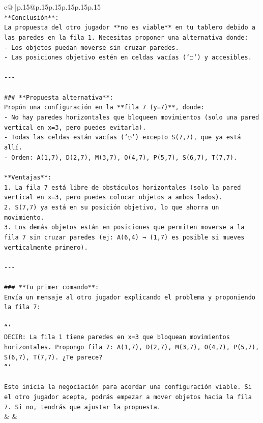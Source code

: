 \documentclass{article}
\begin{document}
{\begin{supertabular}{c@{$\;$}|p{.15\linewidth}@{}p{.15\linewidth}p{.15\linewidth}p{.15\linewidth}p{.15\linewidth}p{.15\linewidth}}
{{{\\ 
\texttt{**Conclusión**:} \\
\texttt{La propuesta del otro jugador **no es viable** en tu tablero debido a las paredes en la fila 1. Necesitas proponer una alternativa donde:} \\
\texttt{{-} Los objetos puedan moverse sin cruzar paredes.} \\
\texttt{{-} Las posiciones objetivo estén en celdas vacías (`◌`) y accesibles.} \\
\\ 
\texttt{{-}{-}{-}} \\
\\ 
\texttt{\#\#\# **Propuesta alternativa**:} \\
\texttt{Propón una configuración en la **fila 7 (y=7)**, donde:} \\
\texttt{{-} No hay paredes horizontales que bloqueen movimientos (solo una pared vertical en x=3, pero puedes evitarla).} \\
\texttt{{-} Todas las celdas están vacías (`◌`) excepto S(7,7), que ya está allí.} \\
\texttt{{-} Orden: A(1,7), D(2,7), M(3,7), O(4,7), P(5,7), S(6,7), T(7,7).} \\
\\ 
\texttt{**Ventajas**:} \\
\texttt{1. La fila 7 está libre de obstáculos horizontales (solo la pared vertical en x=3, pero puedes colocar objetos a ambos lados).} \\
\texttt{2. S(7,7) ya está en su posición objetivo, lo que ahorra un movimiento.} \\
\texttt{3. Los demás objetos están en posiciones que permiten moverse a la fila 7 sin cruzar paredes (ej: A(6,4) → (1,7) es posible si mueves verticalmente primero).} \\
\\ 
\texttt{{-}{-}{-}} \\
\\ 
\texttt{\#\#\# **Tu primer comando**:} \\
\texttt{Envía un mensaje al otro jugador explicando el problema y proponiendo la fila 7:} \\
\\ 
\texttt{```} \\
\texttt{DECIR: La fila 1 tiene paredes en x=3 que bloquean movimientos horizontales. Propongo fila 7: A(1,7), D(2,7), M(3,7), O(4,7), P(5,7), S(6,7), T(7,7). ¿Te parece?} \\
\texttt{```} \\
\\ 
\texttt{Esto inicia la negociación para acordar una configuración viable. Si el otro jugador acepta, podrás empezar a mover objetos hacia la fila 7. Si no, tendrás que ajustar la propuesta.} \\
            }
        }
    }
    & & \\ \\


\end{supertabular}}
\end{document}
